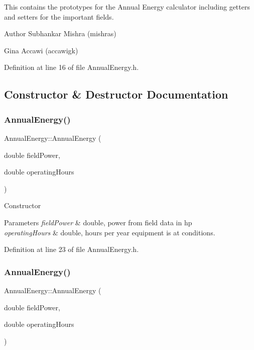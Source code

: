 This contains the prototypes for the Annual Energy calculator including getters and setters for the important fields.

\begin{DoxyAuthor}{Author}
Subhankar Mishra (mishras) 

Gina Accawi (accawigk) 
\end{DoxyAuthor}


Definition at line 16 of file Annual\+Energy.\+h.



\subsection{Constructor \& Destructor Documentation}
\mbox{\label{class_annual_energy_adb693a67965b0ff46436ee5141ab356d}} 
\subsubsection{\texorpdfstring{Annual\+Energy()}{AnnualEnergy()}\hspace{0.1cm}{\footnotesize\ttfamily [1/3]}}
{\footnotesize\ttfamily Annual\+Energy\+::\+Annual\+Energy (\begin{DoxyParamCaption}\item[{double}]{field\+Power,  }\item[{double}]{operating\+Hours }\end{DoxyParamCaption})\hspace{0.3cm}{\ttfamily [inline]}}

Constructor 
\begin{DoxyParams}{Parameters}
{\em field\+Power} & double, power from field data in hp \\
\hline
{\em operating\+Hours} & double, hours per year equipment is at conditions. \\
\hline
\end{DoxyParams}


Definition at line 23 of file Annual\+Energy.\+h.

\mbox{\label{class_annual_energy_adb693a67965b0ff46436ee5141ab356d}} 
\subsubsection{\texorpdfstring{Annual\+Energy()}{AnnualEnergy()}\hspace{0.1cm}{\footnotesize\ttfamily [2/3]}}
{\footnotesize\ttfamily Annual\+Energy\+::\+Annual\+Energy (\begin{DoxyParamCaption}\item[{double}]{field\+Power,  }\item[{double}]{operating\+Hours }\end{DoxyParamCaption})\hspace{0.3cm}{\ttfamily [inline]}}


